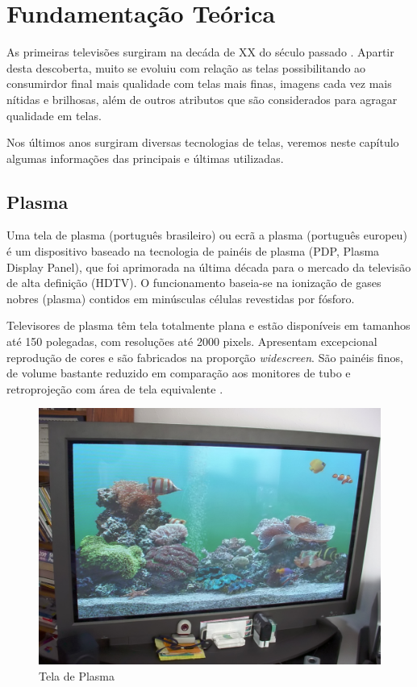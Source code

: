 \chapter{Fundamentação Teórica}
\label{cap:fundamentacao}

As primeiras televisões surgiram na decáda de XX do século passado \cite{WikipediaTelevisao}. Apartir desta descoberta, muito se evoluiu com relação as telas possibilitando ao consumirdor final mais qualidade com telas mais finas, imagens cada vez mais nítidas e brilhosas, além de outros atributos que são considerados para agragar qualidade em telas.

Nos últimos anos surgiram diversas tecnologias de telas, veremos neste capítulo algumas informações das principais e últimas utilizadas.

\section{Plasma}
\label{sec:plasma}

Uma tela de plasma (português brasileiro) ou ecrã a plasma (português europeu) é um dispositivo baseado na tecnologia de painéis de plasma (PDP, Plasma Display Panel), que foi aprimorada na última década para o mercado da televisão de alta definição (HDTV). O funcionamento baseia-se na ionização de gases nobres (plasma) contidos em minúsculas células revestidas por fósforo.

Televisores de plasma têm tela totalmente plana e estão disponíveis em tamanhos até 150 polegadas, com resoluções até 2000 pixels. Apresentam excepcional reprodução de cores e são fabricados na proporção \textit{widescreen}. São painéis finos, de volume bastante reduzido em comparação aos monitores de tubo e retroprojeção com área de tela equivalente \cite{WikipediaTelaPlasma}. 

\begin{figure}[!h]
  \centering
  \includegraphics[width=.40\textwidth]{./figuras/plasma_display} 
  \caption{Tela de Plasma}
  \label{fig:plasma_display} 
\end{figure}

